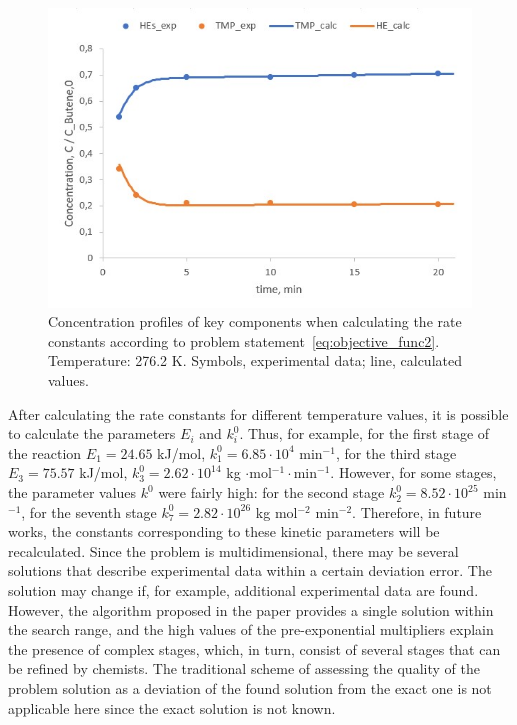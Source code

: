 \documentclass{svproc}
\begin{document}
\begin{figure}
\begin{center}
  \includegraphics[width=0.7\linewidth]{res2.jpg}
  \caption{Concentration profiles of key components when calculating the rate constants according to problem statement~\ref{eq:objective_func2}. Temperature: 276.2 K. Symbols, experimental data; line, calculated values.}
  \label{fig:res2}  
\end{center}
\end{figure}

After calculating the rate constants for different temperature values, it is possible to calculate the parameters $E_i$ and $k_i^0$. Thus, for example, for the first stage of the reaction $E_1 = 24.65$ kJ/mol, $k_1^0 = 6.85 \cdot 10^4$ min$^{-1}$, for the third stage $E_3 = 75.57$ kJ/mol, $k_3^0 = 2.62 \cdot 10^{14}$ kg $\cdot$mol$^{-1}\cdot$min$^{-1}$. However, for some stages, the parameter values $k^0$ were fairly high: for the second stage $k_2^0 = 8.52 \cdot 10^{25}$ min$^{-1}$, for the seventh stage $k_7^0 = 2.82 \cdot 10^{26}$ kg mol$^{-2}$ min$^{-2}$. Therefore, in future works, the constants corresponding to these kinetic parameters will be recalculated.
Since the problem is multidimensional, there may be several solutions that describe experimental data within a certain deviation error. The solution may change if, for example, additional experimental data are found. However, the algorithm proposed in the paper provides a single solution within the search range, and the high values of the pre-exponential multipliers explain the presence of complex stages, which, in turn, consist of several stages that can be refined by chemists. The traditional scheme of assessing the quality of the problem solution as a deviation of the found solution from the exact one is not applicable here since the exact solution is not known.
\end{document}
